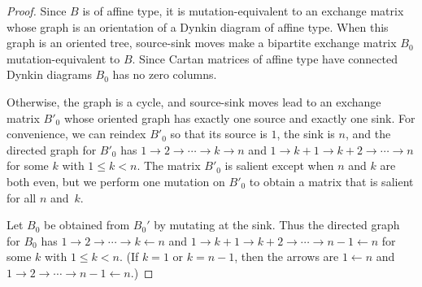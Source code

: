 \documentclass[10pt]{article}
\theoremstyle{definition}
\theoremstyle{remark}
\numberwithin{equation}{section}
\newcommand{\0}{{\mathbf{0}}}
\begin{document}
\begin{proof}
Since $B$ is of affine type, it is mutation-equivalent to an exchange matrix whose graph is an orientation of a Dynkin diagram of affine type.
When this graph is an oriented tree, source-sink moves make a bipartite exchange matrix $B_0$ mutation-equivalent to $B$.
Since Cartan matrices of affine type have connected Dynkin diagrams $B_0$ has no zero columns.

Otherwise, the graph is a cycle, and source-sink moves lead to an exchange matrix $B'_0$ whose oriented graph has exactly one source and exactly one sink.
For convenience, we can reindex $B'_0$ so that its source is $1$, the sink is $n$, and the directed graph for $B'_0$ has ${1\to2\to\cdots\to k\to n}$ and $1\to k+1\to k+2\to\cdots\to n$ for some $k$ with $1\le k<n$.
The matrix $B'_0$ is salient except when $n$ and $k$ are both even, but we perform one mutation on $B'_0$ to obtain a matrix that is salient for all $n$ and~$k$.

Let $B_0$ be obtained from $B_0'$ by mutating at the sink.
Thus the directed graph for $B_0$ has ${1\to2\to\cdots\to k\leftarrow n}$ and $1\to k+1\to k+2\to\cdots\to n-1\leftarrow n$ for some $k$ with $1\le k<n$.
(If $k=1$ or $k=n-1$, then the  arrows are $1\leftarrow n$ and $1\to2\to\cdots\to n-1\leftarrow n$.)


\end{proof}
\end{document}
